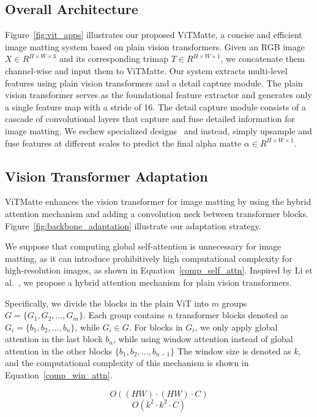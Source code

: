 \documentclass[10pt,twocolumn,letterpaper]{article}
\newcommand{\thename}{ViTMatte}
\begin{document}
\subsection{Overall Architecture}
Figure~\ref{fig:vit_apps} illustrates our proposed \thename{}, a concise and efficient image matting system based on plain vision transformers. Given an RGB image $X\in R^{H\times W\times 3}$ and its corresponding trimap $T\in R^{H\times W\times 1}$, we concatenate them channel-wise and input them to \thename{}. Our system extracts multi-level features using plain vision transformers and a detail capture module. The plain vision transformer serves as the foundational feature extractor and generates only a single feature map with a stride of 16. The detail capture module consists of a cascade of convolutional layers that capture and fuse detailed information for image matting. We eschew specialized designs~\cite{MGM} and instead, simply upsample and fuse features at different scales to predict the final alpha matte $\alpha \in R^{H\times W\times 1}$.

\subsection{Vision Transformer Adaptation}

\thename{} enhances the vision transformer for image matting by using the hybrid attention mechanism and adding a convolution neck between transformer blocks. Figure~\ref{fig:backbone_adaptation} illustrate our adaptation strategy.

We suppose that computing global self-attention is unnecessary for image matting, as it can introduce prohibitively high computational complexity for high-resolution images, as shown in Equation~\eqref{comp_self_attn}. Inspired by Li et al.~\cite{vitdet}, we propose a hybrid attention mechanism for plain vision transformers.

Specifically, we divide the blocks in the plain ViT into $m$ groups $G=\{G_1, G_2, ..., G_m \}$. Each group contains $n$ transformer blocks denoted as $G_i=\{b_1, b_2, ..., b_n\}$, while $G_i\in G$. For blocks in $G_i$, we only apply global attention in the last block $b_n$, while using window attention instead of global attention in the other blocks $\{b_1, b_2, ..., b_{n-1}\}$ The window size is denoted as $k$, and the computational complexity of this mechanism is shown in Equation~\eqref{comp_win_attn}.

\begin{equation}
    O((HW)\cdot(HW)\cdot C)
    \label{comp_self_attn}
\end{equation}
\begin{equation}
     O(k^2 \cdot k^2 \cdot C)
    \label{comp_win_attn}
\end{equation}
\end{document}
